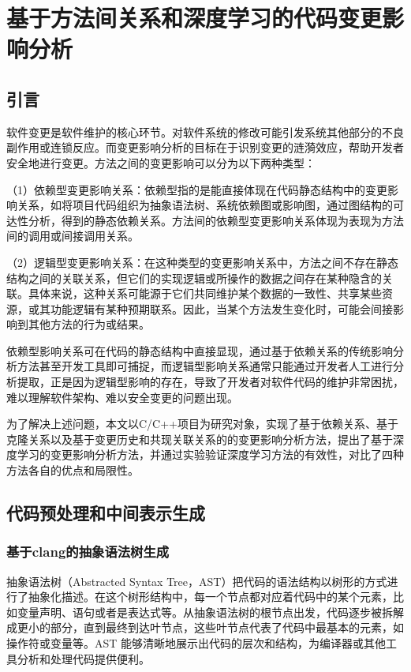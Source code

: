 
\chapter{基于方法间关系和深度学习的代码变更影响分析}

\section{引言}

软件变更是软件维护的核心环节。对软件系统的修改可能引发系统其他部分的不良副作用或连锁反应。而变更影响分析的目标在于识别变更的涟漪效应，帮助开发者安全地进行变更。方法之间的变更影响可以分为以下两种类型：

（1）依赖型变更影响关系：依赖型指的是能直接体现在代码静态结构中的变更影响关系，如将项目代码组织为抽象语法树、系统依赖图或影响图，通过图结构的可达性分析，得到的静态依赖关系。方法间的依赖型变更影响关系体现为表现为方法间的调用或间接调用关系。

（2）逻辑型变更影响关系：在这种类型的变更影响关系中，方法之间不存在静态结构之间的关联关系，但它们的实现逻辑或所操作的数据之间存在某种隐含的关联。具体来说，这种关系可能源于它们共同维护某个数据的一致性、共享某些资源，或其功能逻辑有某种预期联系。因此，当某个方法发生变化时，可能会间接影响到其他方法的行为或结果。

依赖型影响关系可在代码的静态结构中直接显现，通过基于依赖关系的传统影响分析方法甚至开发工具即可捕捉，而逻辑型影响关系通常只能通过开发者人工进行分析提取，正是因为逻辑型影响的存在，导致了开发者对软件代码的维护非常困扰，难以理解软件架构、难以安全变更的问题出现。

为了解决上述问题，本文以C/C++项目为研究对象，实现了基于依赖关系、基于克隆关系以及基于变更历史和共现关联关系的的变更影响分析方法，提出了基于深度学习的变更影响分析方法，并通过实验验证深度学习方法的有效性，对比了四种方法各自的优点和局限性。


\section{代码预处理和中间表示生成}

\subsection{基于clang的抽象语法树生成}
抽象语法树（Abstracted Syntax Tree，AST）把代码的语法结构以树形的方式进行了抽象化描述。在这个树形结构中，每一个节点都对应着代码中的某个元素，比如变量声明、语句或者是表达式等。从抽象语法树的根节点出发，代码逐步被拆解成更小的部分，直到最终到达叶节点，这些叶节点代表了代码中最基本的元素，如操作符或变量等。AST 能够清晰地展示出代码的层次和结构，为编译器或其他工具分析和处理代码提供便利。



